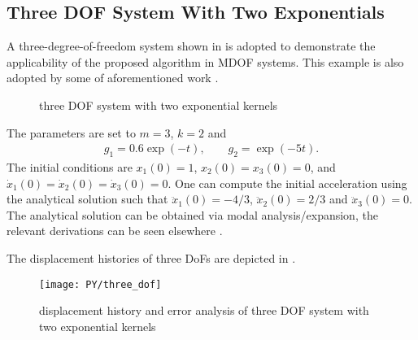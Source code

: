\subsection{Three DOF System With Two Exponentials}
A three-degree-of-freedom system shown in  is adopted to demonstrate the applicability of the proposed algorithm in MDOF systems. This example is also adopted by some of aforementioned work \cite[see, e.g.,][]{Adhikari2004,Cortes2009,Shen2019,Liu2023}.
\begin{figure}[H]
\centering
{}
\caption{three DOF system with two exponential kernels}\label{fig:three_dof}
\end{figure}
The parameters are set to $m=3$, $k=2$ and
\begin{gather}
g_1=\num{0.6}\exp\left(-t\right),\qquad
g_2=\exp\left(-5t\right).
\end{gather}
The initial conditions are $x_1\left(0\right)=1$, $x_2\left(0\right)=x_3\left(0\right)=0$, and $\dot{x}_1\left(0\right)=\dot{x}_2\left(0\right)=\dot{x}_3\left(0\right)=0$. One can compute the initial acceleration using the analytical solution such that $\ddot{x}_1\left(0\right)=-4/3$, $\ddot{x}_2\left(0\right)=2/3$ and $\ddot{x}_3\left(0\right)=0$.
The analytical solution can be obtained via modal analysis/expansion, the relevant derivations can be seen elsewhere \citep{Wagner2003}.

The displacement histories of three DoFs are depicted in .
\begin{figure}[H]
\centering
\texttt{[image: PY/three\_dof]}
\caption{displacement history and error analysis of three DOF system with two exponential kernels}\label{fig:three}
\end{figure}

